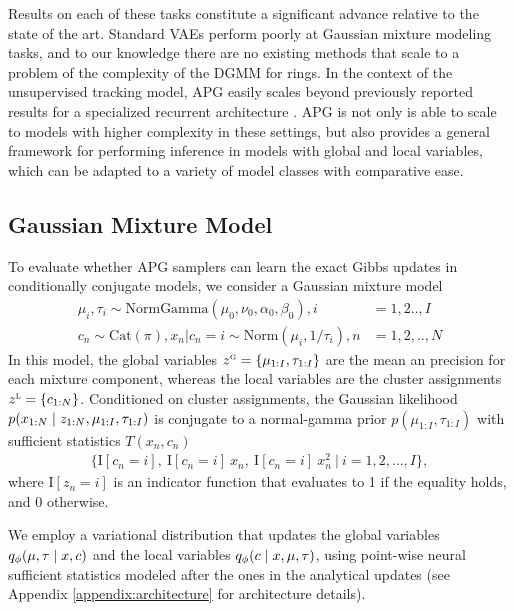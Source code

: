 \documentclass{article}
\theoremstyle{definition}
\begin{document}
Results on each of these tasks constitute a significant advance relative to the state of the art. Standard VAEs perform poorly at Gaussian mixture modeling tasks, and to our knowledge there are no existing methods that scale to a problem of the complexity of the DGMM for rings. In the context of the unsupervised tracking model, APG easily scales beyond previously reported results for a specialized recurrent architecture \cite{kosiorek2018sequential}. APG is not only is able to scale to models with higher complexity in these settings, but also provides a general framework for performing inference in models with global and local variables, which can be adapted to a variety of model classes with comparative ease.

\subsection{Gaussian Mixture Model}
\label{sec:gmm}
\vspace{-0.5em}
To evaluate whether APG samplers can learn the exact Gibbs updates in conditionally conjugate models, we consider a Gaussian mixture model 
\begin{align*}
    \mu_i, \tau_i \sim \text{NormGamma}(\mu_0, \nu_0, \alpha_0, \beta_0)
    , i &=1,2..,I \\
    c_n \sim \mathrm{Cat}(\pi), 
    x_n | c_n\!=\!i \sim \text{Norm}(\mu_i, 1 / \tau_i)
    ,n &=1,2,..,N
\end{align*}
In this model, the global variables $z^\textsc{g} = \{\mu_{1:I}, \tau_{1:I}\}$ are the mean an precision for each mixture component, whereas the local variables are the cluster assignments $z^\textsc{l} = \{c_{1:N}\}$. Conditioned on cluster assignments, the Gaussian likelihood $p(x_{1:N} \mid z_{1:N}, \mu_{1:I}, \tau_{1:I})$ is conjugate to a normal-gamma prior $p(\mu_{1:I}, \tau_{1:I})$ with sufficient statistics $T(x_n, c_n)$ 
\begin{align*}
    \Big\{\mathrm{I}[c_n \!=\! i], 
        ~\mathrm{I}[c_n \!=\! i] \: x_n, 
        ~\mathrm{I}[c_n \!=\! i] \: x_n^2 
        ~\Big\vert~ i \!=\! 1,2,\dots,I 
    \Big\}
    ,
\end{align*}
where $\mathrm{I}[z_n \!=\! i]$ is an indicator function that evaluates to 1 if the equality holds, and 0 otherwise.

We employ a variational distribution that updates the global variables $q_\phi(\mu, \tau \mid x, c)$ and the local variables $q_\phi(c \mid x, \mu, \tau)$, using point-wise neural sufficient statistics modeled after the ones in the analytical updates (see Appendix \ref{appendix:architecture} for architecture details).
\end{document}

